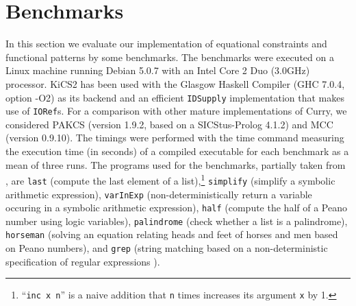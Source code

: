 \documentclass{llncs}
\newcommand{\code}[1]{\mbox{\small\texttt{#1}}}
\newcommand{\ccode}[1]{``\code{#1}''}
\begin{document}
\section{Benchmarks}
\label{sec:Benchmarks}


In this section we evaluate our implementation of
equational constraints and functional patterns by some benchmarks.
The benchmarks were executed on a Linux machine running Debian 5.0.7 with
an Intel Core 2 Duo (3.0GHz) processor.
KiCS2 has been used with
the Glasgow Haskell Compiler (GHC 7.0.4, option -O2) as its backend and
an efficient \code{IDSupply} implementation that makes use of \code{IORef}s.
For a comparison with other mature implementations of Curry,
we considered PAKCS \cite{Hanus10PAKCS}
(version 1.9.2, based on a SICStus-Prolog 4.1.2)
and MCC \cite{Lux99FLOPS} (version 0.9.10). The timings were performed with the
time command measuring the execution time (in seconds) of a compiled
executable for each benchmark as a mean of three runs.
The programs used for the benchmarks,
partially taken from \cite{AntoyHanus05LOPSTR},
are \code{last} (compute the last element of a list),\footnote{%
\ccode{inc x n} is a naive addition that \code{n} times
increases its argument \code{x} by 1.}
\code{simplify} (simplify a symbolic arithmetic expression),
\code{varInExp} (non-deterministically return a variable occuring
                  in a symbolic arithmetic expression),
\code{half} (compute the half of a Peano number using logic variables),
\code{palindrome} (check whether a list is a palindrome),
\code{horseman} (solving an equation relating heads and feet of horses and men
based on Peano numbers),
and
\code{grep} (string matching based on a non-deterministic
specification of regular expressions \cite{AntoyHanus10CACM}).
\end{document}
